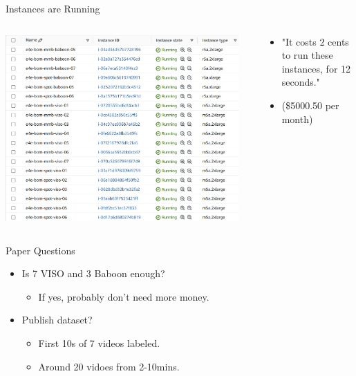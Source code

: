 \begin{frame}{Instances are Running}
    \begin{columns}
        \begin{column}{0.6\textwidth}
            \centering
            \includegraphics[height=0.8\textheight,width=0.95\textwidth,keepaspectratio]{images/bom/aws.jpg}
        \end{column}
        \begin{column}{0.4\textwidth}
            \begin{itemize}
                \item "It costs 2 cents to run these instances, for 12 seconds."
                \item (\$5000.50 per month)
            \end{itemize}
        \end{column}
    \end{columns}
\end{frame}

\begin{frame}{Paper Questions}
    \begin{itemize}
        \item Is 7 VISO and 3 Baboon enough?
        \begin{itemize}
            \item If yes, probably don't need more money.
        \end{itemize}
        \item Publish dataset?
        \begin{itemize}
            \item First 10s of 7 videos labeled.
            \item Around 20 vidoes from 2-10mins. 
        \end{itemize}
    \end{itemize}
\end{frame}
